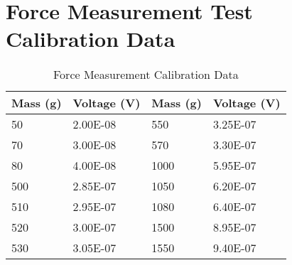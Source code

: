 \chapter{Force Measurement Test Calibration Data} 
\label{App:AppendixA}


\begin{table}[htbp]
\centering
\caption{Force Measurement Calibration Data}
\label{CalData}
\begin{tabular}{@{}llll@{}}
\toprule
\textbf{Mass (g)} & \textbf{Voltage (V)} & \textbf{Mass (g)} & \textbf{Voltage (V)} \\ \midrule
50                & 2.00E-08             & 550               & 3.25E-07             \\
70                & 3.00E-08             & 570               & 3.30E-07             \\
80                & 4.00E-08             & 1000              & 5.95E-07             \\
500               & 2.85E-07             & 1050              & 6.20E-07             \\
510               & 2.95E-07             & 1080              & 6.40E-07             \\
520               & 3.00E-07             & 1500              & 8.95E-07             \\
530               & 3.05E-07             & 1550              & 9.40E-07             \\ \bottomrule
\end{tabular}
\end{table}


